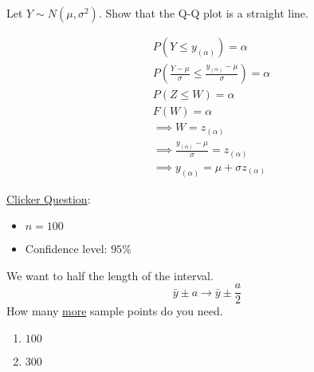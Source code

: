Let $ Y \sim N(\mu,\sigma^2) $. Show that the Q-Q plot is a straight line.
\begin{Proof}{}{}
    \begin{align*}
         & P(Y\leqslant y_{(\alpha)})=\alpha                                                      \\
         & P\left( \frac{Y-\mu}{\sigma} \leqslant \frac{y_{(\alpha)}-\mu}{\sigma}  \right)=\alpha \\
         & P(Z\leqslant W)=\alpha                                                                 \\
         & F(W)=\alpha                                                                            \\
         & \implies W=z_{(\alpha)}                                                                \\
         & \implies \frac{y_{(\alpha)}-\mu}{\sigma}=z_{(\alpha)}                                  \\
         & \implies y_{(\alpha)}=\mu+\sigma z_{(\alpha)}
    \end{align*}
\end{Proof}

\underline{Clicker Question}:
\begin{itemize}
    \item $ n=100 $
    \item Confidence level: $ 95\% $
\end{itemize}
We want to half the length of the interval.
\[ \bar{y}\pm a\rightarrow \bar{y}\pm \frac{a}{2} \] How many
\underline{more} sample points do you need.
\begin{enumerate}[label=(\alph*)]
    \item $ 100 $
    \item $ 300 $
\end{enumerate}
